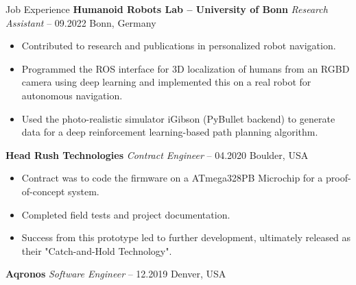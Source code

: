 \begin{rubric}{Job Experience}
%
%
\entry*[] \textbf{Humanoid Robots Lab -- University of Bonn} \hfill \textit{Research Assistant}  -- 09.2022 \hfill Bonn, Germany \newline 
\vspace{\CVItemizeHeaderSpacing} \begin{itemize} %
	\setlength{\itemsep}{\CVItemizeSpacing}
	\item Contributed to research and publications in personalized robot navigation.
	\item Programmed the ROS interface for 3D localization of humans from an RGBD camera using deep learning and implemented this on a real robot for autonomous navigation.
	\item Used the photo-realistic simulator iGibson (PyBullet backend) to generate data for a deep reinforcement learning-based path planning algorithm. 
\end{itemize}
%
%
\entry*[] \textbf{Head Rush Technologies} \hfill \textit{Contract Engineer}  -- 04.2020 \hfill Boulder, USA \newline 
\vspace{\CVItemizeHeaderSpacing} \begin{itemize} %
	\setlength{\itemsep}{\CVItemizeSpacing}
	\item Contract was to code the firmware on a ATmega328PB Microchip for a proof-of-concept system.  
	\item Completed field tests and project documentation.  
	\item Success from this prototype led to further development, ultimately released as their "Catch-and-Hold Technology".
\end{itemize}
%
%
\entry*[] \textbf{Aqronos} \hfill \textit{Software Engineer}  -- 12.2019 \hfill Denver, USA \newline
\vspace{\CVItemizeHeaderSpacing} \begin{itemize} %

\end{itemize}
\end{rubric}
